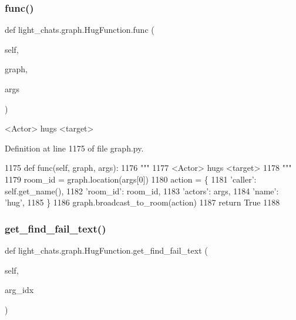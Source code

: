 \subsubsection{\texorpdfstring{func()}{func()}}
{\footnotesize\ttfamily def light\+\_\+chats.\+graph.\+Hug\+Function.\+func (\begin{DoxyParamCaption}\item[{}]{self,  }\item[{}]{graph,  }\item[{}]{args }\end{DoxyParamCaption})}

\begin{DoxyVerb}<Actor> hugs <target>
\end{DoxyVerb}
 

Definition at line 1175 of file graph.\+py.


\begin{DoxyCode}
1175     \textcolor{keyword}{def }func(self, graph, args):
1176         \textcolor{stringliteral}{"""}
1177 \textcolor{stringliteral}{        <Actor> hugs <target>}
1178 \textcolor{stringliteral}{        """}
1179         room\_id = graph.location(args[0])
1180         action = \{
1181             \textcolor{stringliteral}{'caller'}: self.get\_name(),
1182             \textcolor{stringliteral}{'room\_id'}: room\_id,
1183             \textcolor{stringliteral}{'actors'}: args,
1184             \textcolor{stringliteral}{'name'}: \textcolor{stringliteral}{'hug'},
1185         \}
1186         graph.broadcast\_to\_room(action)
1187         \textcolor{keywordflow}{return} \textcolor{keyword}{True}
1188 
\end{DoxyCode}
\mbox{\label{classlight__chats_1_1graph_1_1HugFunction_a3a8b8178a34dff402172109bcd9c9ebf}} 
\subsubsection{\texorpdfstring{get\+\_\+find\+\_\+fail\+\_\+text()}{get\_find\_fail\_text()}}
{\footnotesize\ttfamily def light\+\_\+chats.\+graph.\+Hug\+Function.\+get\+\_\+find\+\_\+fail\+\_\+text (\begin{DoxyParamCaption}\item[{}]{self,  }\item[{}]{arg\+\_\+idx }\end{DoxyParamCaption})}



